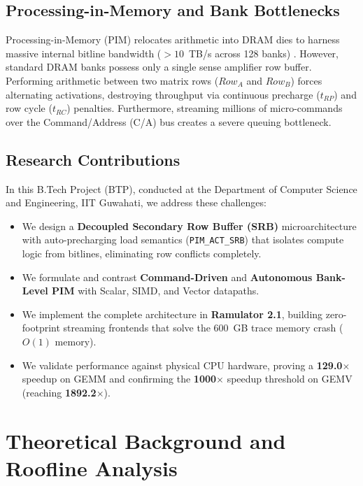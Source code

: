 \documentclass[10pt,twocolumn]{article}
\begin{document}
\subsection{Processing-in-Memory and Bank Bottlenecks}
Processing-in-Memory (PIM) relocates arithmetic into DRAM dies to harness massive internal bitline bandwidth ($>10$~TB/s across 128 banks) \cite{mutlu2020modern, lee2021hardware}. However, standard DRAM banks possess only a single sense amplifier row buffer. Performing arithmetic between two matrix rows ($Row_A$ and $Row_B$) forces alternating activations, destroying throughput via continuous precharge ($t_{RP}$) and row cycle ($t_{RC}$) penalties. Furthermore, streaming millions of micro-commands over the Command/Address (C/A) bus creates a severe queuing bottleneck.

\subsection{Research Contributions}
In this B.Tech Project (BTP), conducted at the Department of Computer Science and Engineering, IIT Guwahati, we address these challenges:
\begin{itemize}
    \item We design a \textbf{Decoupled Secondary Row Buffer (SRB)} microarchitecture with auto-precharging load semantics (\texttt{PIM\_ACT\_SRB}) that isolates compute logic from bitlines, eliminating row conflicts completely.
    \item We formulate and contrast \textbf{Command-Driven} and \textbf{Autonomous Bank-Level PIM} with Scalar, SIMD, and Vector datapaths.
    \item We implement the complete architecture in \textbf{Ramulator 2.1}, building zero-footprint streaming frontends that solve the 600~GB trace memory crash ($O(1)$ memory).
    \item We validate performance against physical CPU hardware, proving a \textbf{129.0$\times$} speedup on GEMM and confirming the \textbf{1000$\times$} speedup threshold on GEMV (reaching \textbf{1892.2$\times$}).
\end{itemize}

\section{Theoretical Background and Roofline Analysis}
\label{sec:background}
\end{document}
